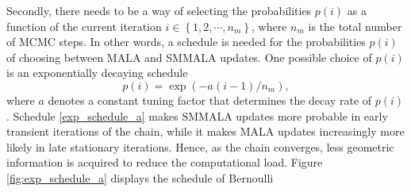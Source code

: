 \documentclass[twoside,11pt]{article}
\begin{document}
Secondly, there needs to be a way of selecting the probabilities $p(i)$ as a function of the current iteration
$i\in\left\{1,2,\cdots,n_m\right\}$, where $n_m$ is the total number of MCMC steps. In other words, a schedule is needed for
the probabilities $p(i)$ of choosing between MALA and SMMALA updates. One possible choice of $p(i)$ is an exponentially 
decaying schedule
\begin{equation}
\label{exp_schedule_a}
p(i)=\exp{(-a(i-1)/n_m)},
\end{equation}
where $a$ denotes a constant tuning factor that determines the decay rate of $p(i)$.
Schedule \eqref{exp_schedule_a} makes SMMALA updates more probable in early transient iterations of the chain, while it 
makes MALA updates increasingly more likely in late stationary iterations. Hence, as the chain converges, less geometric 
information is acquired to reduce the computational load. Figure \ref{fig:exp_schedule_a} displays the schedule of Bernoulli 
\end{document}
